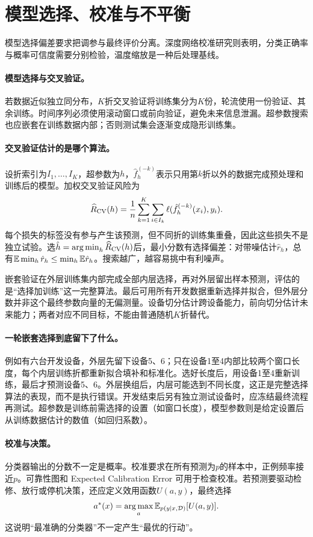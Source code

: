 \section{模型选择、校准与不平衡}
模型选择偏差要求把调参与最终评价分离\cite{cawley2010selection}。深度网络校准研究则表明，分类正确率与概率可信度需要分别检验，温度缩放是一种后处理基线\cite{guo2017calibration}。
\paragraph{模型选择与交叉验证。}
若数据近似独立同分布，$K$折交叉验证将训练集分为$K$份，轮流使用一份验证、其余训练。时间序列必须使用滚动窗口或前向验证，避免未来信息泄漏。超参数搜索也应嵌套在训练数据内部；否则测试集会逐渐变成隐形训练集。

\paragraph{交叉验证估计的是哪个算法。}
设折索引为$I_1,\ldots,I_K$，超参数为$h$，$\hat f_h^{(-k)}$表示只用第$k$折以外的数据完成预处理和训练后的模型。加权交叉验证风险为
\begin{equation}
 \widehat R_{\rm CV}(h)=\frac1n\sum_{k=1}^K\sum_{i\in I_k}
 \ell(\hat f_h^{(-k)}(x_i),y_i).
\end{equation}
每个损失的标签没有参与产生该预测，但不同折的训练集重叠，因此这些损失不是独立试验。选$\hat h=\mathop{\mathrm{arg\,min}}_h\widehat R_{\rm CV}(h)$后，最小分数有选择偏差：对带噪估计$\hat r_h$，总有$\mathbb{E}\min_h\hat r_h\leq\min_h\mathbb{E}\hat r_h$。搜索越广，越容易挑中有利噪声。

嵌套验证在外层训练集内部完成全部内层选择，再对外层留出样本预测，评估的是“选择加训练”这一完整算法。最后可用所有开发数据重新选择并拟合，但外层分数并非这个最终参数向量的无偏测量。设备切分估计跨设备能力，前向切分估计未来能力；两者对应不同目标，不能由普通随机$K$折替代。

\paragraph{一轮嵌套选择到底留下了什么。}
例如有六台开发设备，外层先留下设备5、6；只在设备1至4内部比较两个窗口长度，每个内层训练折都重新拟合填补和标准化。选好长度后，用设备1至4重新训练，最后才预测设备5、6。外层换组后，内层可能选到不同长度，这正是完整选择算法的表现，而不是执行错误。开发结束后另有独立测试设备时，应冻结最终流程再测试。超参数是训练前需选择的设置（如窗口长度），模型参数则是给定设置后从训练数据估计的数值（如回归系数）。

\paragraph{校准与决策。}
分类器输出的分数不一定是概率。校准要求在所有预测为$p$的样本中，正例频率接近$p$。可靠性图和 Expected Calibration Error 可用于检查校准。若预测要驱动检修、放行或停机决策，还应定义效用函数$U(a,y)$，最终选择
\begin{equation}
 a^*(x)=\mathop{\mathrm{arg\,max}}_a\mathbb{E}_{p(y\mid x,\mathcal{D})}[U(a,y)].
\end{equation}
这说明“最准确的分类器”不一定产生“最优的行动”。

